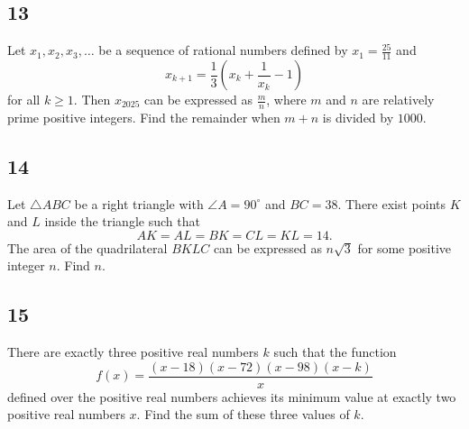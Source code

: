 \subsection{13}
Let $x_1, x_2, x_3, \ldots$ be a sequence of rational numbers defined by $x_1 = \frac{25}{11}$ and
$$x_{k+1} = \frac{1}{3}\left(x_k + \frac{1}{x_k} - 1\right)$$
for all $k \ge 1$. Then $x_{2025}$ can be expressed as $\frac{m}{n}$, where $m$ and $n$ are relatively prime positive integers. Find the remainder when $m + n$ is divided by $1000$.

\subsection{14}
Let $\triangle ABC$ be a right triangle with $\angle A = 90^\circ$ and $BC = 38$. There exist points $K$ and $L$ inside the triangle such that
$$AK = AL = BK = CL = KL = 14.$$
The area of the quadrilateral $BKLC$ can be expressed as $n\sqrt{3}$ for some positive integer $n$. Find $n$.

\subsection{15}
There are exactly three positive real numbers $k$ such that the function
$$f(x) = \frac{(x - 18)(x - 72)(x - 98)(x - k)}{x}$$
defined over the positive real numbers achieves its minimum value at exactly two positive real numbers $x$. Find the sum of these three values of $k$.

